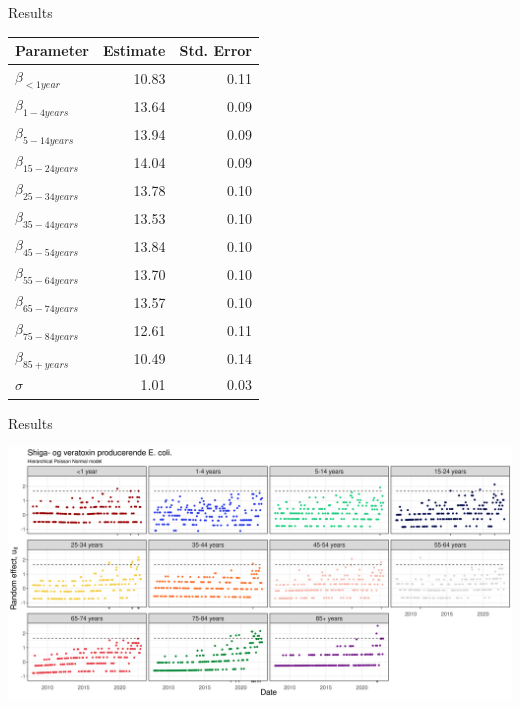 \documentclass[aspectratio=169]{beamer}
\begin{document}
\begin{frame}{Results}
\tiny

\begin{table}
\centering\begingroup\fontsize{10}{12}\selectfont

\begin{tabular}{lrr}
\toprule
Parameter & Estimate & Std. Error\\
\midrule
$\beta_{<1 year}$ & 10.83 & 0.11\\
$\beta_{1-4 years}$ & 13.64 & 0.09\\
$\beta_{5-14 years}$ & 13.94 & 0.09\\
$\beta_{15-24 years}$ & 14.04 & 0.09\\
$\beta_{25-34 years}$ & 13.78 & 0.10\\
$\beta_{35-44 years}$ & 13.53 & 0.10\\
$\beta_{45-54 years}$ & 13.84 & 0.10\\
$\beta_{55-64 years}$ & 13.70 & 0.10\\
$\beta_{65-74 years}$ & 13.57 & 0.10\\
$\beta_{75-84 years}$ & 12.61 & 0.11\\
$\beta_{85+ years}$ & 10.49 & 0.14\\
$\sigma$ & 1.01 & 0.03\\
\bottomrule
\end{tabular}
\endgroup{}
\end{table}

\normalsize
\end{frame}

\begin{frame}{Results}
\protect\hypertarget{results-1}{}
\tiny

\includegraphics[width=1\linewidth]{../figures/PoisLNxSTEC}

\normalsize
\end{frame}
\end{document}
